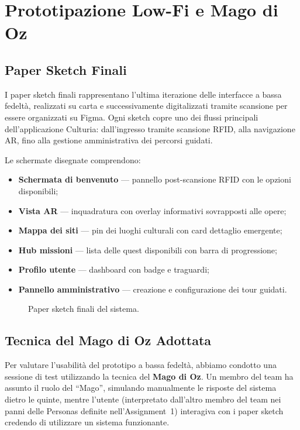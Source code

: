 \section{Prototipazione Low-Fi e Mago di Oz}

\subsection{Paper Sketch Finali}

I paper sketch finali rappresentano l'ultima iterazione delle interfacce a bassa fedeltà, realizzati su carta e successivamente digitalizzati tramite scansione per essere organizzati su Figma. Ogni sketch copre uno dei flussi principali dell'applicazione Culturia: dall'ingresso tramite scansione RFID, alla navigazione AR, fino alla gestione amministrativa dei percorsi guidati.

Le schermate disegnate comprendono:
\begin{itemize}[nosep, leftmargin=1.6em]
    \item \textbf{Schermata di benvenuto} — pannello post-scansione RFID con le opzioni disponibili;
    \item \textbf{Vista AR} — inquadratura con overlay informativi sovrapposti alle opere;
    \item \textbf{Mappa dei siti} — pin dei luoghi culturali con card dettaglio emergente;
    \item \textbf{Hub missioni} — lista delle quest disponibili con barra di progressione;
    \item \textbf{Profilo utente} — dashboard con badge e traguardi;
    \item \textbf{Pannello amministrativo} — creazione e configurazione dei tour guidati.
\end{itemize}

\begin{figure}[H]
    \centering
    \caption{Paper sketch finali del sistema.}
    \label{fig:paper_sketches}
\end{figure}

\subsection{Tecnica del Mago di Oz Adottata}

Per valutare l'usabilità del prototipo a bassa fedeltà, abbiamo condotto una sessione di test utilizzando la tecnica del \textbf{Mago di Oz}. Un membro del team ha assunto il ruolo del ``Mago'', simulando manualmente le risposte del sistema dietro le quinte, mentre l'utente (interpretato dall'altro membro del team nei panni delle Personas definite nell'Assignment~1) interagiva con i paper sketch credendo di utilizzare un sistema funzionante.

